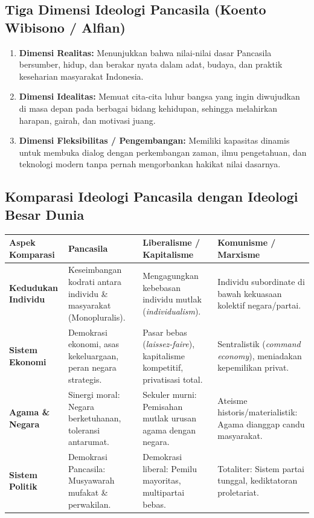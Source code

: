 \documentclass[10pt,a4paper]{article}
\begin{document}
\subsection{Tiga Dimensi Ideologi Pancasila (Koento Wibisono / Alfian)}
\begin{enumerate}
  \item \textbf{Dimensi Realitas:} Menunjukkan bahwa nilai-nilai dasar Pancasila bersumber, hidup, dan berakar nyata dalam adat, budaya, dan praktik keseharian masyarakat Indonesia.
  \item \textbf{Dimensi Idealitas:} Memuat cita-cita luhur bangsa yang ingin diwujudkan di masa depan pada berbagai bidang kehidupan, sehingga melahirkan harapan, gairah, dan motivasi juang.
  \item \textbf{Dimensi Fleksibilitas / Pengembangan:} Memiliki kapasitas dinamis untuk membuka dialog dengan perkembangan zaman, ilmu pengetahuan, dan teknologi modern tanpa pernah mengorbankan hakikat nilai dasarnya.
\end{enumerate}

\subsection{Komparasi Ideologi Pancasila dengan Ideologi Besar Dunia}
\begin{tabularx}{\linewidth}{lYYY}
  \toprule
  \textbf{Aspek Komparasi} & \textbf{Pancasila} & \textbf{Liberalisme / Kapitalisme} & \textbf{Komunisme / Marxisme} \\
  \midrule
  \textbf{Kedudukan Individu} & Keseimbangan kodrati antara individu \& masyarakat (Monopluralis). & Mengagungkan kebebasan individu mutlak (\textit{individualism}). & Individu subordinate di bawah kekuasaan kolektif negara/partai. \\
  \textbf{Sistem Ekonomi} & Demokrasi ekonomi, asas kekeluargaan, peran negara strategis. & Pasar bebas (\textit{laissez-faire}), kapitalisme kompetitif, privatisasi total. & Sentralistik (\textit{command economy}), meniadakan kepemilikan privat. \\
  \textbf{Agama \& Negara} & Sinergi moral: Negara berketuhanan, toleransi antarumat. & Sekuler murni: Pemisahan mutlak urusan agama dengan negara. & Ateisme historis/materialistik: Agama dianggap candu masyarakat. \\
  \textbf{Sistem Politik} & Demokrasi Pancasila: Musyawarah mufakat \& perwakilan. & Demokrasi liberal: Pemilu mayoritas, multipartai bebas. & Totaliter: Sistem partai tunggal, kediktatoran proletariat. \\
  \bottomrule
\end{tabularx}
\end{document}
